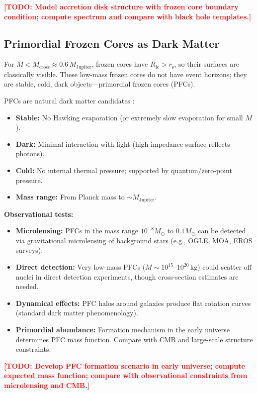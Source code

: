 \documentclass[12pt,a4paper]{article}
\newcommand{\TODO}[1]{\textcolor{red}{\textbf{[TODO: #1]}}}
\newcommand{\Rfc}{R_\text{fc}}
\newcommand{\Mcross}{M_\text{cross}}
\theoremstyle{definition}
\begin{document}
\TODO{Model accretion disk structure with frozen core boundary condition; compute spectrum and compare with black hole templates.}

\subsection{Primordial Frozen Cores as Dark Matter}
\label{subsec:primordial_frozen_cores}

For $M < \Mcross \approx 0.6\,M_\text{Jupiter}$, frozen cores have $\Rfc > r_\text{s}$, so their surfaces are classically visible. These low-mass frozen cores do not have event horizons; they are stable, cold, dark objects—primordial frozen cores (PFCs).

PFCs are natural dark matter candidates \cite{PlanckFieldI}:
\begin{itemize}
  \item \textbf{Stable:} No Hawking evaporation (or extremely slow evaporation for small $M$).
  \item \textbf{Dark:} Minimal interaction with light (high impedance surface reflects photons).
  \item \textbf{Cold:} No internal thermal pressure; supported by quantum/zero-point pressure.
  \item \textbf{Mass range:} From Planck mass to $\sim M_\text{Jupiter}$.
\end{itemize}

\textbf{Observational tests:}
\begin{itemize}
  \item \textbf{Microlensing:} PFCs in the mass range $10^{-8} M_\odot$ to $0.1 M_\odot$ can be detected via gravitational microlensing of background stars (e.g., OGLE, MOA, EROS surveys).
  \item \textbf{Direct detection:} Very low-mass PFCs ($M \sim 10^{15}$--$10^{20}\,\text{kg}$) could scatter off nuclei in direct detection experiments, though cross-section estimates are needed.
  \item \textbf{Dynamical effects:} PFC halos around galaxies produce flat rotation curves (standard dark matter phenomenology).
  \item \textbf{Primordial abundance:} Formation mechanism in the early universe determines PFC mass function. Compare with CMB and large-scale structure constraints.
\end{itemize}

\TODO{Develop PFC formation scenario in early universe; compute expected mass function; compare with observational constraints from microlensing and CMB.}
\end{document}
